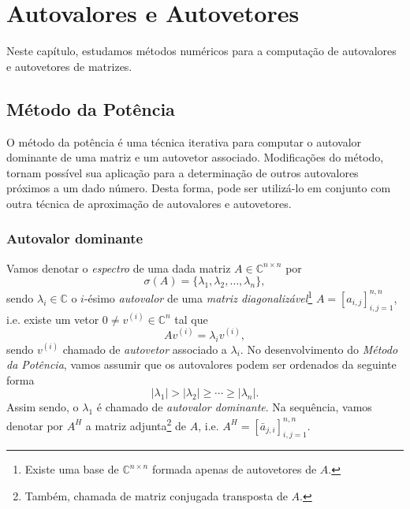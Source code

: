 \chapter{Autovalores e Autovetores}\label{cap_autoval}
\badgeRevisar

Neste capítulo, estudamos métodos numéricos para a computação de autovalores e autovetores de matrizes.

\section{Método da Potência}\label{cap_autoval_sec_pot}
\badgeRevisar

O método da potência é uma técnica iterativa para computar o autovalor dominante de uma matriz e um autovetor associado. Modificações do método, tornam possível sua aplicação para a determinação de outros autovalores próximos a um dado número. Desta forma, pode ser utilizá-lo em conjunto com outra técnica de aproximação de autovalores e autovetores.

\subsection{Autovalor dominante}
\badgeRevisar

Vamos denotar o \emph{espectro} de uma dada matriz $A\in\mathbb{C}^{n\times n}$ por
\begin{equation}
  \sigma(A) = \{\lambda_1, \lambda_2, \dotsc, \lambda_n\},
\end{equation}
sendo $\lambda_i\in \mathbb{C}$ o $i$-ésimo \emph{autovalor} de uma \emph{matriz diagonalizável}\footnote{Existe uma base de $\mathbb{C}^{n\times n}$ formada apenas de autovetores de $A$.} $A=[a_{i,j}]_{i,j=1}^{n,n}$, i.e. existe um vetor $0\neq v^{(i)}\in\mathbb{C}^n$ tal que
\begin{equation}
  Av^{(i)} = \lambda_i v^{(i)},
\end{equation}
sendo $v^{(i)}$ chamado de \emph{autovetor} associado a $\lambda_i$. No desenvolvimento do \emph{Método da Potência}, vamos assumir que os autovalores podem ser ordenados da seguinte forma
\begin{equation}
  |\lambda_1| > |\lambda_2| \geq \cdots \geq |\lambda_n|.
\end{equation}
Assim sendo, o $\lambda_1$ é chamado de \emph{autovalor dominante}. Na sequência, vamos denotar por $A^H$ a matriz adjunta\footnote{Também, chamada de matriz conjugada transposta de $A$.} de $A$, i.e. $A^H=[\bar{a}_{j,i}]_{i,j=1}^{n,n}$.

